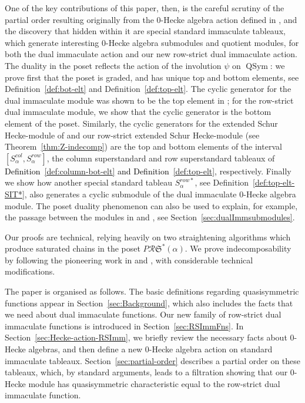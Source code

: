 \documentclass[12pt,letterpaper]{amsart}
\newcommand{\svw}{\textcolor{black}}
\theoremstyle{definition}
\newcommand{\rdI}{\mathcal{R}\mathfrak{S}^*}
\newcommand{\Qsym}{\ensuremath{\operatorname{QSym}}}
\begin{document}
One of the key contributions of this paper, then, is the 
careful scrutiny of the partial order resulting originally from the 0-Hecke algebra action defined in \cite{BBSSZ2015}, and the discovery that hidden within it are special standard immaculate tableaux, which generate interesting 0-Hecke algebra submodules and quotient modules, for both the dual immaculate action and our new row-strict dual immaculate action.
The duality in the poset reflects the action of the involution $\psi$ on $\Qsym$: we prove first that the poset is graded, and has unique top and bottom elements, see Definition~\ref{def:bot-elt} and Definition~\ref{def:top-elt}. The cyclic generator for the dual immaculate module was shown to be the top element in \cite{BBSSZ2015};  for the row-strict dual immaculate module, we show that  the cyclic generator is the  bottom element of the poset.  Similarly, the cyclic generators for the extended Schur Hecke-module of \cite{S2020} and our row-strict extended Schur Hecke-module (see Theorem~\ref{thm:Z-indecomp}) are the top and bottom elements of the interval $[S^{col}_\alpha, S^{row}_\alpha]$, the column superstandard and row superstandard tableaux of   \svw{Definition~\ref{def:column-bot-elt} and Definition~\ref{def:top-elt}}, respectively.
Finally we show how another special standard tableau $S^{row*}_\alpha$, see Definition~\ref{def:top-elt-SIT*}, also generates a cyclic submodule of the dual immaculate 0-Hecke algebra module.
The poset duality phenomenon can also be used to explain, for example, the passage between the modules in \cite{TvW2015} and \cite{BS2021}, see  Section~\ref{sec:dualImmsubmodules}. 

Our proofs are technical,  relying heavily on two  straightening algorithms which produce saturated chains in the poset $P\rdI(\alpha).$   We prove  indecomposability by following the pioneering work in \cite{TvW2015} and  \cite{BBSSZ2015},  with considerable technical modifications.

The paper is organised as follows.  The basic definitions regarding quasisymmetric functions appear in Section~\ref{sec:Background}, which also includes the facts that we need about dual immaculate functions. Our new family of row-strict dual immaculate functions is introduced in Section~\ref{sec:RSImmFns}. In  Section~\ref{sec:Hecke-action-RSImm}, we briefly review the necessary facts about 0-Hecke algebras, and then define a new  0-Hecke algebra action on standard immaculate tableaux. Section~\ref{sec:partial-order} describes a partial order on these tableaux, which, by standard arguments, leads to a filtration showing that our 0-Hecke module has quasisymmetric characteristic equal to the row-strict dual immaculate function.
\end{document}
